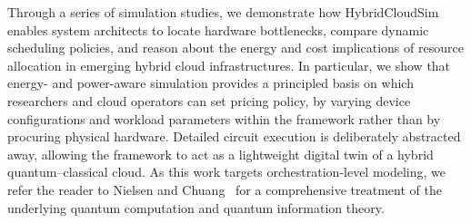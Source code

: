 Through a series of simulation studies, we demonstrate how HybridCloudSim
enables system architects to locate hardware bottlenecks, compare dynamic
scheduling policies, and reason about the energy and cost implications of
resource allocation in emerging hybrid cloud infrastructures. In particular,
we show that energy- and power-aware simulation provides a principled basis on
which researchers and cloud operators can set pricing policy, by varying
device configurations and workload parameters within the framework rather than
by procuring physical hardware. Detailed circuit execution is deliberately
abstracted away, allowing the framework to act as a lightweight digital twin
of a hybrid quantum--classical cloud. As this work targets orchestration-level
modeling, we refer the reader to Nielsen and Chuang~\cite{nielsen2010quantum}
for a comprehensive treatment of the underlying quantum computation and
quantum information theory.
